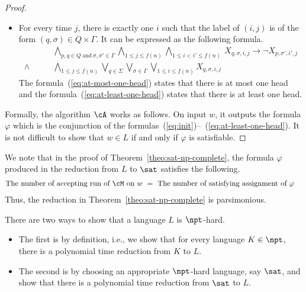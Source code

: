 \documentclass[11pt, a4paper]{article}
\begin{document}
\begin{proof}
\begin{itemize}
\item 
For every time $j$, there is exactly one $i$
such that the label of $(i,j)$ is of the form $(q,\sigma)\in Q\times \Gamma$.
It can be expressed as the following formula.
\begin{align}
\label{eq:at-most-one-head}
&
\bigwedge_{p,q\in Q\ \text{and}\ \sigma,\sigma'\in \Gamma}
\bigwedge_{1\leq j \leq f(n)}
\bigwedge_{1\leq i < i' \leq f(n)}
\
X_{q,\sigma,i,j} \to \neg X_{p,\sigma',i',j}
\\
\label{eq:at-least-one-head}
\wedge \qquad
&
\bigwedge_{1\leq j \leq f(n)}
\bigvee_{q\in \Sigma}\bigvee_{\sigma\in\Gamma}\bigvee_{1\leq i \leq f(n)}
X_{q,\sigma,i,j}
\end{align}
The formula~(\ref{eq:at-most-one-head}) states that there is at most one head
and the formula~(\ref{eq:at-least-one-head}) states that there is at least one head.
\end{itemize}

Formally, the algorithm $\cA$ works as follows.
On input $w$, it outputs the formula $\varphi$ which is the conjunction of the 
formulas~(\ref{eq:init})--~(\ref{eq:at-least-one-head}).
It is not difficult to show that $w\in L$ if and only if $\varphi$ is satisfiable.
\end{proof}


\begin{remark}
We note that in the proof of Theorem~\ref{theo:sat-np-complete},
the formula $\varphi$ produced in the reduction from $L$ to $\sat$ satisfies the following.
\begin{align*}
\text{The number of accepting run of $\cM$ on $w$} & \ =\
\text{The number of satisfying assignment of $\varphi$} 
\end{align*}
Thus, the reduction in Theorem~\ref{theo:sat-np-complete} is parsimonious.
\end{remark}


\begin{remark}
There are two ways to show that a language $L$ is $\npt$-hard.
\begin{itemize}
\item
The first is by definition, i.e., we show that for every language $K\in \npt$,
there is a polynomial time reduction from $K$ to $L$.
\item 
The second is by choosing an appropriate $\npt$-hard language, say $\sat$,
and show that there is a polynomial time reduction from $\sat$ to $L$.
\end{itemize}
\end{remark}
\end{document}
